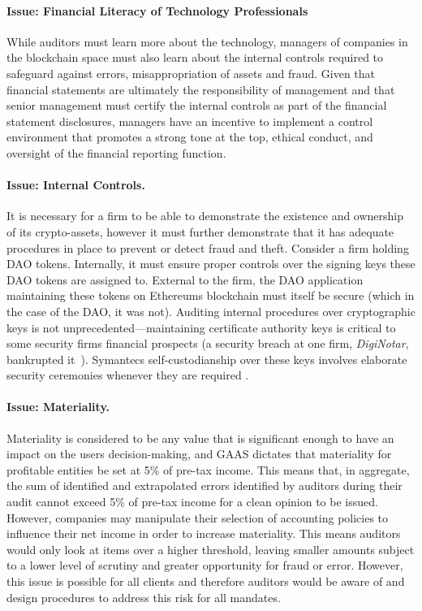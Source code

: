 \paragraph{Issue: Financial Literacy of Technology Professionals} While auditors must learn more about the technology, managers of companies in the blockchain space must also learn about the internal controls required to safeguard against errors, misappropriation of assets and fraud. Given that financial statements are ultimately the responsibility of management and that senior management must certify the internal controls as part of the financial statement disclosures, managers have an incentive to implement a control environment that promotes a strong tone at the top, ethical conduct, and oversight of the financial reporting function.

\paragraph{Issue: Internal Controls.} It is necessary for a firm to be able to demonstrate the existence and ownership of its crypto-assets, however it must further demonstrate that it has adequate procedures in place to prevent or detect fraud and theft. Consider a firm holding DAO tokens. Internally, it must ensure proper controls over the signing keys these DAO tokens are assigned to. External to the firm, the DAO application maintaining these tokens on Ethereum\textquotesingle s blockchain must itself be secure (which in the case of the DAO, it was not). Auditing internal procedures over cryptographic keys is not unprecedented---maintaining certificate authority keys is critical to some security firm\textquotesingle s financial prospects (a security breach at one firm, \textit{DigiNotar}, bankrupted it~\cite{zetter2011diginotar}). Symantec\textquotesingle s self-custodianship over these keys involves elaborate security ceremonies whenever they are required \todo{[Cite]}. 

\paragraph{Issue: Materiality.} Materiality is considered to be any value that is significant enough to have an impact on the user\textquotesingle s decision-making, and GAAS dictates that materiality for profitable entities be set at 5\% of pre-tax income. This means that, in aggregate, the sum of identified and extrapolated errors identified by auditors during their audit cannot exceed 5\% of pre-tax income for a clean opinion to be issued. However, companies may manipulate their selection of accounting policies to influence their net income in order to increase materiality. This means auditors would only look at items over a higher threshold, leaving smaller amounts subject to a lower level of scrutiny and greater opportunity for fraud or error. However, this issue is possible for all clients and therefore auditors would be aware of and design procedures to address this risk for all mandates.
 
